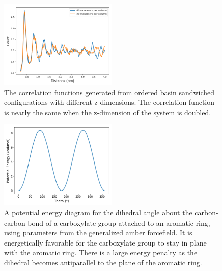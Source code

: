 \documentclass[journal=jpcbfk,manusciprt=article]{achemso}
\begin{document}
  \begin{figure}[!htb]
  \centering
  \includegraphics[width=0.5\textwidth]{z_correlation_overlay.png}
  \caption{The correlation functions generated from ordered basin sandwiched configurations
  with different z-dimensions. The correlation function is nearly the same when the z-dimension
  of the system is doubled.}\label{fig:z_correlation_overlay}
  \end{figure}
  
  \begin{figure}[!htb]
  \centering
  \includegraphics[width=0.5\textwidth]{carboxylate_dihedral_rb.png}
  \caption{A potential energy diagram for the dihedral angle about the carbon-carbon bond of
  a carboxylate group attached to an aromatic ring, using parameters from the generalized amber 
  forcefield. It is energetically favorable for the carboxylate group to stay in plane with 
  the aromatic ring. There is a large energy penalty as the dihedral becomes antiparallel to 
  the plane of the aromatic ring.}\label{fig:carboxylate_dihedral_rb}
  \end{figure}
  


\clearpage

\end{document}
